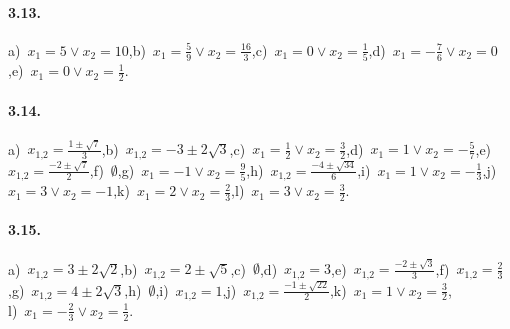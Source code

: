 \paragraph{3.13.} a)~$x_{1} =5\vee x_{2} = 10$,\quad b)~$x_{1} =\frac{5}{9}\vee x_{2} =\frac{16}{3}$,\quad c)~$x_{1} = 0 \vee x_{2} =\frac{1}{5}$,\quad d)~$x_{1} =-\frac{7}{6} \vee x_{2} =0$,\quad e)~$x_{1} =0 \vee x_{2} =\frac{1}{2}$. %

\paragraph{3.14.} a)~$x_{1\text{,}2} = \frac{1 \pm \sqrt{7}}{3}$,\quad b)~$x_{1\text{,}2} =-3 \pm 2 \sqrt{3}$,\quad c)~$x_{1} = \frac{1}{2} \vee x_{2} = \frac{3}{2}$,\quad d)~$x_{1} = 1 \vee x_{2} =-\frac{5}{7}$,\quad e)~$x_{1\text{,}2} = \frac{- 2 \pm \sqrt{7}}{2}$,\quad f)~$\emptyset$,\quad g)~$x_{1} =-1 \vee x_{2} = \frac{9}{5}$,\quad h)~$x_{1\text{,}2} = \frac{- 4 \pm \sqrt{34}}{6}$,\quad i)~$x_{1} = 1 \vee x_{2} =-\frac{1}{3}$,\quad j)~$x_{1} = 3 \vee x_{2} =-1$,\quad k)~$x_{1} = 2 \vee x_{2} = \frac{2}{3}$,\quad l)~$x_{1} = 3 \vee x_{2} = \frac{3}{2}$.



\paragraph{3.15.} a)~$x_{1\text{,}2} = 3 \pm 2 \sqrt{2}$,\quad b)~$x_{1\text{,}2} = 2 \pm \sqrt{5}$,\quad c)~$\emptyset$,\quad d)~$x_{1\text{,}2} =3$,\quad e)~$x_{1\text{,}2} = \frac{- 2 \pm \sqrt{3}}{3}$,\quad f)~$x_{1\text{,}2} = \frac{2}{3}$,\quad g)~$x_{1\text{,}2} = 4 \pm 2 \sqrt{3}$,\quad h)~$\emptyset$,\quad i)~$x_{1\text{,}2} = 1$,\quad j)~$x_{1\text{,}2} = \frac{-1\pm \sqrt{22}}{2}$,\quad k)~$x_{1} = 1 \vee x_{2} = \frac{3}{2}$,\protect\\
l)~$x_{1} = -\frac{2}{3} \vee x_{2} = \frac{1}{2}$.

